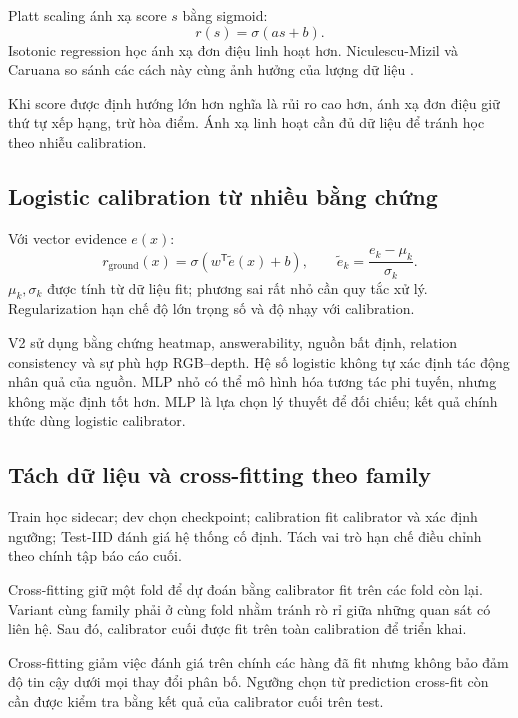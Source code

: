 Platt scaling ánh xạ score $s$ bằng sigmoid:
\begin{equation}
    r(s)=\sigma(as+b).
    \label{eq:theory-platt}
\end{equation}
Isotonic regression học ánh xạ đơn điệu linh hoạt hơn. Niculescu-Mizil và Caruana so sánh các cách này cùng ảnh hưởng của lượng dữ liệu \cite{niculescu2005probabilities}.

Khi score được định hướng lớn hơn nghĩa là rủi ro cao hơn, ánh xạ đơn điệu giữ thứ tự xếp hạng, trừ hòa điểm. Ánh xạ linh hoạt cần đủ dữ liệu để tránh học theo nhiễu calibration.

\subsection{Logistic calibration từ nhiều bằng chứng}

Với vector evidence $e(x)$:
\begin{equation}
    r_{\mathrm{ground}}(x)=
    \sigma(w^{\mathsf T}\widetilde{e}(x)+b),
    \qquad \widetilde{e}_k=\frac{e_k-\mu_k}{\sigma_k}.
    \label{eq:theory-logistic-calibration}
\end{equation}
$\mu_k,\sigma_k$ được tính từ dữ liệu fit; phương sai rất nhỏ cần quy tắc xử lý. Regularization hạn chế độ lớn trọng số và độ nhạy với calibration.

V2 sử dụng bằng chứng heatmap, answerability, nguồn bất định, relation consistency và sự phù hợp RGB--depth. Hệ số logistic không tự xác định tác động nhân quả của nguồn. MLP nhỏ có thể mô hình hóa tương tác phi tuyến, nhưng không mặc định tốt hơn. MLP là lựa chọn lý thuyết để đối chiếu; kết quả chính thức dùng logistic calibrator.

\subsection{Tách dữ liệu và cross-fitting theo family}

Train học sidecar; dev chọn checkpoint; calibration fit calibrator và xác định ngưỡng; Test-IID đánh giá hệ thống cố định. Tách vai trò hạn chế điều chỉnh theo chính tập báo cáo cuối.

Cross-fitting giữ một fold để dự đoán bằng calibrator fit trên các fold còn lại. Variant cùng family phải ở cùng fold nhằm tránh rò rỉ giữa những quan sát có liên hệ. Sau đó, calibrator cuối được fit trên toàn calibration để triển khai.

Cross-fitting giảm việc đánh giá trên chính các hàng đã fit nhưng không bảo đảm độ tin cậy dưới mọi thay đổi phân bố. Ngưỡng chọn từ prediction cross-fit còn cần được kiểm tra bằng kết quả của calibrator cuối trên test.

